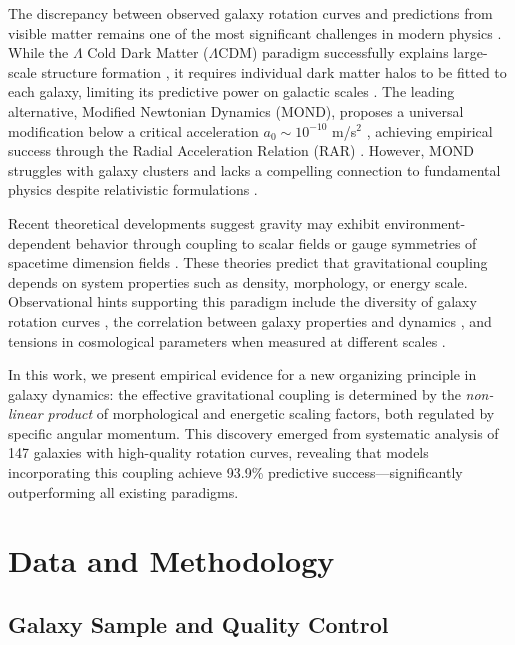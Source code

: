 \documentclass[aps,prd,twocolumn,superscriptaddress,nofootinbib,longbibliography]{revtex4-2}
\begin{document}
The discrepancy between observed galaxy rotation curves and predictions from visible matter remains one of the most significant challenges in modern physics \cite{Zwicky1933,Rubin1980,Rubin1983}. While the $\Lambda$ Cold Dark Matter ($\Lambda$CDM) paradigm successfully explains large-scale structure formation \cite{Planck2020,DESI2024}, it requires individual dark matter halos to be fitted to each galaxy, limiting its predictive power on galactic scales \cite{Bullock2017,Sales2022}. The leading alternative, Modified Newtonian Dynamics (MOND), proposes a universal modification below a critical acceleration $a_0 \sim 10^{-10}$ m/s$^2$ \cite{Milgrom1983,Famaey2012}, achieving empirical success through the Radial Acceleration Relation (RAR) \cite{McGaugh2016,Lelli2017}. However, MOND struggles with galaxy clusters \cite{Angus2008} and lacks a compelling connection to fundamental physics despite relativistic formulations \cite{Bekenstein2004,Skordis2021}.

Recent theoretical developments suggest gravity may exhibit environment-dependent behavior through coupling to scalar fields \cite{Khoury2004,Brax2021} or gauge symmetries of spacetime dimension fields \cite{PartanenTulkki2025}. These theories predict that gravitational coupling depends on system properties such as density, morphology, or energy scale. Observational hints supporting this paradigm include the diversity of galaxy rotation curves \cite{Oman2015}, the correlation between galaxy properties and dynamics \cite{Lelli2016SPARC}, and tensions in cosmological parameters when measured at different scales \cite{Riess2022,DiValentino2021}.

In this work, we present empirical evidence for a new organizing principle in galaxy dynamics: the effective gravitational coupling is determined by the \textit{non-linear product} of morphological and energetic scaling factors, both regulated by specific angular momentum. This discovery emerged from systematic analysis of 147 galaxies with high-quality rotation curves, revealing that models incorporating this coupling achieve 93.9\% predictive success—significantly outperforming all existing paradigms.

\section{Data and Methodology}

\subsection{Galaxy Sample and Quality Control}
\end{document}
